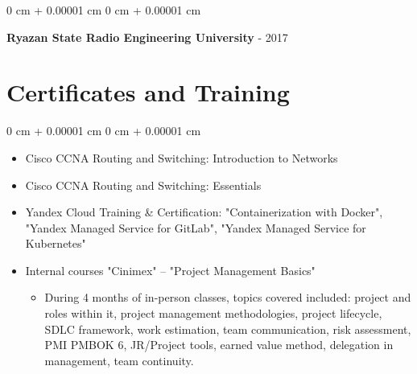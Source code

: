 \documentclass[10pt, letterpaper]{article}
\newenvironment{highlights}{
    \begin{itemize}[
        topsep=0.10 cm,
        parsep=0.10 cm,
        partopsep=0pt,
        itemsep=0pt,
        leftmargin=0 cm + 10pt
    ]
}{
    \end{itemize}
} %
\newenvironment{onecolentry}{
    \begin{adjustwidth}{
        0 cm + 0.00001 cm
    }{
        0 cm + 0.00001 cm
    }
}{
    \end{adjustwidth}
} %
\newenvironment{twocolentry}[2][]{
    \onecolentry
    \def\secondColumn{#2}
    \setcolumnwidth{\fill, 4.5 cm}
    \begin{paracol}{2}
}{
    \switchcolumn \raggedleft \secondColumn
    \end{paracol}
    \endonecolentry
} %
\begin{document}
        \begin{twocolentry}{
            2014 - 2017
        }
            \textbf{Ryazan State Radio Engineering University}\end{twocolentry}

        \vspace{0.10 cm}
    
    \section{Certificates and Training}
        \begin{onecolentry}
                \begin{highlights}
                    \item Cisco CCNA Routing and Switching: Introduction to Networks
                    \item Cisco CCNA Routing and Switching: Essentials
                    \item Yandex Cloud Training & Certification: "Containerization with Docker", "Yandex Managed Service for GitLab", "Yandex Managed Service for Kubernetes"
                    \item Internal courses "Cinimex" – "Project Management Basics"
                    \begin{itemize}
                         \item During 4 months of in-person classes, topics covered included: project and roles within it, project management methodologies, project lifecycle, SDLC framework, work estimation, team communication, risk assessment, PMI PMBOK 6, JR/Project tools, earned value method, delegation in management, team continuity.
                    \end{itemize}
                     
                \end{highlights}
            \end{onecolentry}
\end{document}
